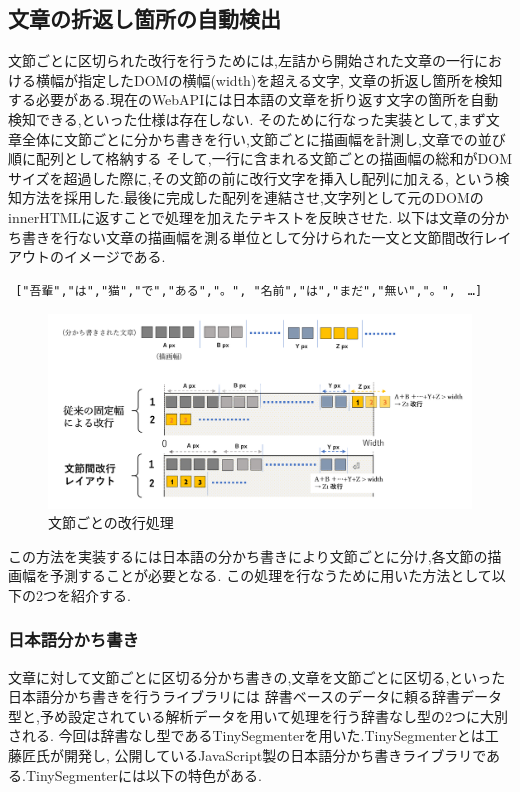 \subsection{文章の折返し箇所の自動検出}
文節ごとに区切られた改行を行うためには,左詰から開始された文章の一行における横幅が指定したDOMの横幅(width)を超える文字,
文章の折返し箇所を検知する必要がある.現在のWebAPIには日本語の文章を折り返す文字の箇所を自動検知できる,といった仕様は存在しない.
そのために行なった実装として,まず文章全体に文節ごとに分かち書きを行い,文節ごとに描画幅を計測し,文章での並び順に配列として格納する
そして,一行に含まれる文節ごとの描画幅の総和がDOMサイズを超過した際に,その文節の前に改行文字を挿入し配列に加える,
という検知方法を採用した.最後に完成した配列を連結させ,文字列として元のDOMのinnerHTMLに返すことで処理を加えたテキストを反映させた.
以下は文章の分かち書きを行ない文章の描画幅を測る単位として分けられた一文と文節間改行レイアウトのイメージである.

\begin{verbatim} ["吾輩","は","猫","で","ある","。", "名前","は","まだ","無い","。",　…]
\end{verbatim}

\begin{figure}[H]
    \centering
    \label{fig:image14}
    \includegraphics[width=0.7\columnwidth]{image/03/img6.png}
	\caption[文節ごとの改行処理]{文節ごとの改行処理}
\end{figure}

この方法を実装するには日本語の分かち書きにより文節ごとに分け,各文節の描画幅を予測することが必要となる.
この処理を行なうために用いた方法として以下の2つを紹介する.

\subsubsection{日本語分かち書き}
文章に対して文節ごとに区切る分かち書きの,文章を文節ごとに区切る,といった日本語分かち書きを行うライブラリには
辞書ベースのデータに頼る辞書データ型と,予め設定されている解析データを用いて処理を行う辞書なし型の2つに大別される.
今回は辞書なし型であるTinySegmenterを用いた.TinySegmenterとは工藤匠氏が開発し,
公開しているJavaScript製の日本語分かち書きライブラリである.\footnotemark[3]
TinySegmenterには以下の特色がある.

